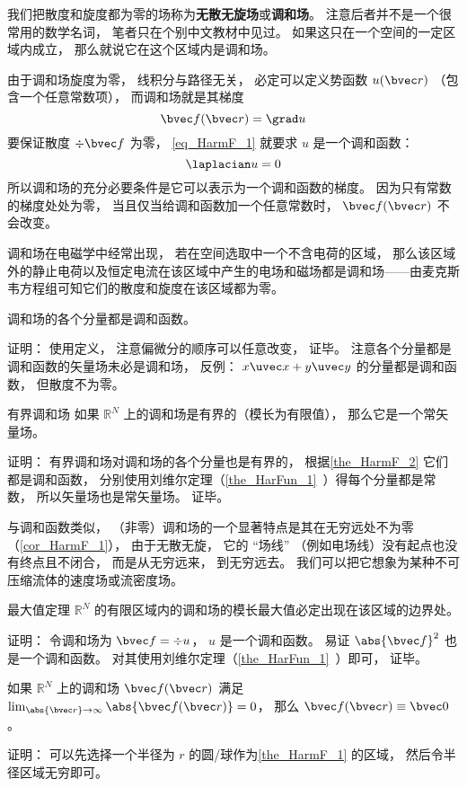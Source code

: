 


我们把散度和旋度都为零的场称为\textbf{无散无旋场}或\textbf{调和场}。 注意后者并不是一个很常用的数学名词， 笔者只在个别中文教材中见过。 如果这只在一个空间的一定区域内成立， 那么就说它在这个区域内是调和场。

由于调和场旋度为零， 线积分与路径无关， 必定可以定义势函数 $u(\bvec r)$ （包含一个任意常数项）， 而调和场就是其梯度
\begin{equation}\label{eq_HarmF_1}
\bvec f(\bvec r) = \grad u
\end{equation}
要保证散度 $\div \bvec f$ 为零， \autoref{eq_HarmF_1} 就要求 $u$ 是一个调和函数：
\begin{equation}
\laplacian u = 0
\end{equation}
所以调和场的充分必要条件是它可以表示为一个调和函数的梯度。 因为只有常数的梯度处处为零， 当且仅当给调和函数加一个任意常数时， $\bvec f(\bvec r)$ 不会改变。

调和场在电磁学中经常出现， 若在空间选取中一个不含电荷的区域， 那么该区域外的静止电荷以及恒定电流在该区域中产生的电场和磁场都是调和场——由麦克斯韦方程组可知它们的散度和旋度在该区域都为零。

\begin{theorem}{}\label{the_HarmF_2}
调和场的各个分量都是调和函数。
\end{theorem}
证明： 使用定义， 注意偏微分的顺序可以任意改变， 证毕。 注意各个分量都是调和函数的矢量场未必是调和场， 反例： $x\uvec x + y \uvec y$ 的分量都是调和函数， 但散度不为零。

\begin{corollary}{有界调和场}
如果 $\mathbb R^N$ 上的调和场是有界的（模长为有限值）， 那么它是一个常矢量场。
\end{corollary}
证明： 有界调和场对调和场的各个分量也是有界的， 根据\autoref{the_HarmF_2} 它们都是调和函数， 分别使用刘维尔定理（\autoref{the_HarFun_1}~）得每个分量都是常数， 所以矢量场也是常矢量场。 证毕。

与调和函数类似， （非零）调和场的一个显著特点是其在无穷远处不为零（\autoref{cor_HarmF_1}）， 由于无散无旋， 它的 “场线” （例如电场线）没有起点也没有终点且不闭合， 而是从无穷远来， 到无穷远去。 我们可以把它想象为某种不可压缩流体的速度场或流密度场。

\begin{theorem}{最大值定理}\label{the_HarmF_1}
$\mathbb R^N$ 的有限区域内的调和场的模长最大值必定出现在该区域的边界处。
\end{theorem}
证明： 令调和场为 $\bvec f = \div u$， $u$ 是一个调和函数。 易证 $\abs{\bvec f}^2$ 也是一个调和函数。 对其使用刘维尔定理（\autoref{the_HarFun_1}~）即可， 证毕。

\begin{corollary}{}\label{cor_HarmF_1}
如果 $\mathbb R^N$ 上的调和场 $\bvec f(\bvec r)$ 满足 $\lim_{\abs{\bvec r}\to \infty} \abs{\bvec f(\bvec r)}  = 0$， 那么 $\bvec f(\bvec r) \equiv \bvec 0$。
\end{corollary}
证明： 可以先选择一个半径为 $r$ 的圆/球作为\autoref{the_HarmF_1} 的区域， 然后令半径区域无穷即可。
